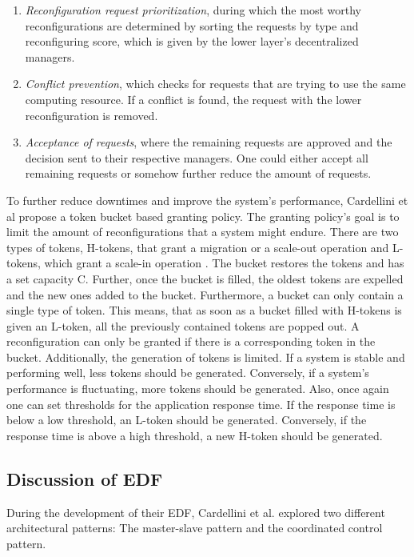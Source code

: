         \begin{enumerate}
            \item \textit{Reconfiguration request prioritization}, during which the most worthy reconfigurations are determined by sorting the requests 
            by type and reconfiguring score, which is given by the lower layer's decentralized managers. 
            \item \textit{Conflict prevention}, which checks for requests that are trying to use the same computing resource. If a conflict is found, the 
            request with the lower reconfiguration is removed.
            \item \textit{Acceptance of requests}, where the remaining requests are approved and the decision sent to their respective managers. 
            One could either accept all remaining requests or somehow further reduce the amount of requests.
        \end{enumerate}

        To further reduce downtimes and improve the system's performance, Cardellini et al propose a token bucket based granting policy.
        The granting policy's goal is to limit the amount of reconfigurations that a system might endure.
        There are two types of tokens, H-tokens, that grant a migration or a scale-out operation and L-tokens, which grant a scale-in operation \cite{cardellini}.
        The bucket restores the tokens and has a set capacity C. Further, once the bucket is filled, the oldest tokens are expelled and the new ones added to the bucket.
        Furthermore, a bucket can only contain a single type of token. This means, that as soon as a bucket filled with H-tokens is given an L-token, all the previously contained tokens 
        are popped out.
        A reconfiguration can only be granted if there is a corresponding token in the bucket.
        Additionally, the generation of tokens is limited. If a system is stable and performing well, less tokens should be generated. Conversely, if a system's performance 
        is fluctuating, more tokens should be generated.
        Also, once again one can set thresholds for the application response time. If the response time is below a low threshold, an L-token should be generated. 
        Conversely, if the response time is above a high threshold, a new H-token should be generated.


        \subsection{Discussion of EDF}
        \label{sub:discussion-edf}
        During the development of their EDF, Cardellini et al. explored two different architectural patterns: The master-slave pattern and the coordinated control pattern.

